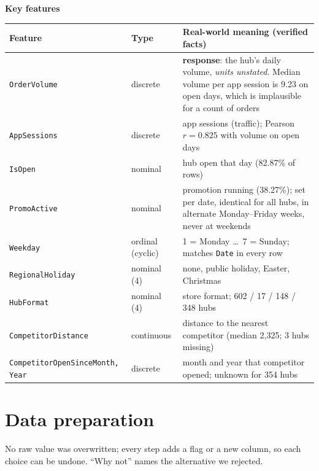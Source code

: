 \documentclass[10pt,a4paper,twocolumn]{article}
\newcommand{\minihead}[1]{\par\needspace{8\baselineskip}\smallskip\textbf{#1}\par}
\newcommand{\code}[1]{\texttt{#1}}
\begin{document}
\minihead{Key features}
{\footnotesize
\begin{tabularx}{\linewidth}{@{}L{3.25cm} L{1.35cm} Y@{}}
\toprule
\textbf{Feature} & \textbf{Type} & \textbf{Real-world meaning (verified facts)} \\
\midrule
\code{OrderVolume} & discrete & \textbf{response}: the hub's daily volume, \emph{units unstated}. Median volume per app
  session is 9.23 on open days, which is implausible for a count of orders \\
\code{AppSessions} & discrete & app sessions (traffic); Pearson $r=0.825$ with volume on open days \\
\code{IsOpen} & nominal & hub open that day (82.87\% of rows) \\
\code{PromoActive} & nominal & promotion running (38.27\%); set per date, identical for all hubs, in alternate
  Monday--Friday weeks, never at weekends \\
\code{Weekday} & ordinal (cyclic) & 1 = Monday \dots\ 7 = Sunday; matches \code{Date} in every row \\
\code{RegionalHoliday} & nominal (4) & none, public holiday, Easter, Christmas \\
\code{HubFormat} & nominal (4) & store format; 602 / 17 / 148 / 348 hubs \\
\code{CompetitorDistance} & continuous & distance to the nearest competitor (median 2{,}325; 3 hubs missing) \\
\code{CompetitorOpenSince}\newline\code{Month, Year} & discrete & month and year that competitor opened; unknown for 354 hubs \\
\bottomrule
\end{tabularx}}

\section{Data preparation}

No raw value was overwritten; every step adds a flag or a new column, so each choice can be undone.
``Why not'' names the alternative we rejected.
\end{document}
